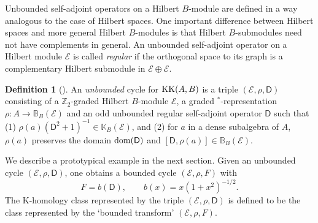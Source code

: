 \documentclass[11pt,reqno]{amsart}
\theoremstyle{definition}
\newtheorem{definition}[theorem]{Definition}
\theoremstyle{remark}
\newcommand{\st}[1]{\mathsf{#1}}
\def\E{\ensuremath{\mathcal{E}}}
\def\bZ{\ensuremath{\mathbb{Z}}}
\def\bB{\ensuremath{\mathbb{B}}}
\def\bK{\ensuremath{\mathbb{K}}}
\def\KK{\ensuremath{\textnormal{KK}}}
\def\dom{\ensuremath{\textnormal{dom}}}
\begin{document}
Unbounded self-adjoint operators on a Hilbert $B$-module are defined in a way analogous to the case of Hilbert spaces.  One important difference between Hilbert spaces and more general Hilbert $B$-modules is that Hilbert $B$-submodules need not have complements in general.  An unbounded self-adjoint operator on a Hilbert module $\E$ is called \emph{regular} if the orthogonal space to its graph is a complementary Hilbert submodule in $\E \oplus \E$.
\begin{definition}[\cite{BaajJulg}]
\label{def:Unbounded}
An \emph{unbounded} cycle for $\KK(A,B)$ is a triple $(\E,\rho,\st{D})$ consisting of a $\bZ_2$-graded Hilbert $B$-module $\E$, a graded $^\ast$-representation $\rho\colon A \rightarrow \bB_B(\E)$ and an odd unbounded regular self-adjoint operator $\st{D}$ such that (1) $\rho(a)(\st{D}^2+1)^{-1} \in \bK_B(\E)$, and (2) for $a$ in a dense subalgebra of $A$, $\rho(a)$ preserves the domain $\dom(\st{D})$ and $[\st{D},\rho(a)] \in \bB_B(\E)$.
\end{definition}
We describe a prototypical example in the next section.  Given an unbounded cycle $(\E,\rho,\st{D})$, one obtains a bounded cycle $(\E,\rho,F)$ with
\[ F=b(\st{D}), \qquad b(x)=x(1+x^2)^{-1/2}.\]
The K-homology class represented by the triple $(\E,\rho,\st{D})$ is defined to be the class represented by the `bounded transform' $(\E,\rho,F)$.
\end{document}
